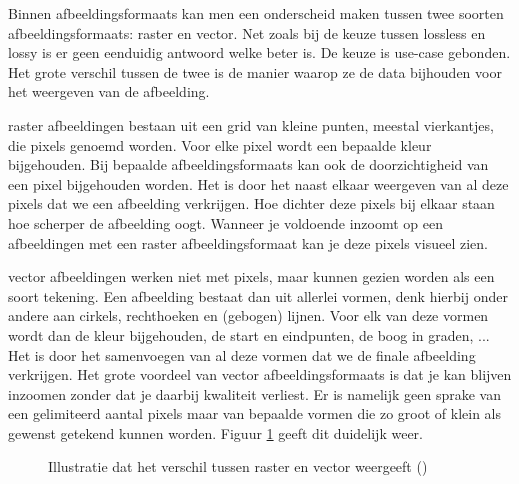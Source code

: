 Binnen \glspl{afbeeldingsformaat} kan men een onderscheid maken tussen twee soorten \glspl{afbeeldingsformaat}: \gls{raster} en \gls{vector}. Net zoals bij de keuze tussen \gls{lossless} en \gls{lossy} is er geen eenduidig antwoord welke beter is. De keuze is \gls{use-case} gebonden. Het grote verschil tussen de twee is de manier waarop ze de data bijhouden voor het weergeven van de afbeelding.

\Gls{raster} afbeeldingen bestaan uit een grid van kleine punten, meestal vierkantjes, die \glspl{pixel} genoemd worden. Voor elke pixel wordt een bepaalde kleur bijgehouden. Bij bepaalde \glspl{afbeeldingsformaat} kan ook de doorzichtigheid van een pixel bijgehouden worden. Het is door het naast elkaar weergeven van al deze pixels dat we een afbeelding verkrijgen. Hoe dichter deze pixels bij elkaar staan hoe scherper de afbeelding oogt. Wanneer je voldoende inzoomt op een afbeeldingen met een \gls{raster} \gls{afbeeldingsformaat} kan je deze pixels visueel zien.

\Gls{vector} afbeeldingen werken niet met \glspl{pixel}, maar kunnen gezien worden als een soort tekening. Een afbeelding bestaat dan uit allerlei vormen, denk hierbij onder andere aan cirkels, rechthoeken en (gebogen) lijnen. Voor elk van deze vormen wordt dan de kleur bijgehouden, de start en eindpunten, de boog in graden, ... Het is door het samenvoegen van al deze vormen dat we de finale afbeelding verkrijgen. Het grote voordeel van vector \glspl{afbeeldingsformaat} is dat je kan blijven inzoomen zonder dat je daarbij kwaliteit verliest. Er is namelijk geen sprake van een gelimiteerd aantal pixels maar van bepaalde vormen die zo groot of klein als gewenst getekend kunnen worden. Figuur \ref{fig:raster-vs-vector} geeft dit duidelijk weer.

\begin{figure}
	\centering
	\caption{Illustratie dat het verschil tussen \gls{raster} en \gls{vector} weergeeft (\cite{rastervsvector})}
	\label{fig:raster-vs-vector}
\end{figure}

